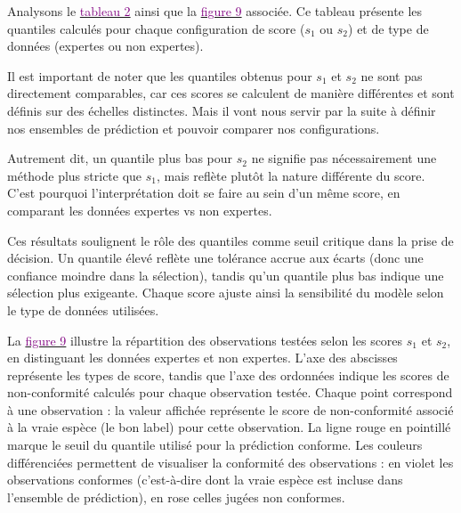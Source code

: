 \documentclass[a4paper,12pt]{article}
\begin{document}
Analysons le \hyperref[tab: scores et quantiles]{\textcolor{purple}{tableau 2}} ainsi que la \hyperref[fig:quantiles]{\textcolor{purple}{figure 9}} associée.
Ce tableau présente les quantiles calculés pour chaque configuration de score ($s_1$ ou $s_2$) et de type de données (expertes ou non expertes).

\vspace{0.2cm}

Il est important de noter que les quantiles obtenus pour $s_1$ et $s_2$ ne sont pas directement comparables, car ces scores se calculent de manière différentes et sont définis sur des échelles distinctes. Mais il vont nous servir par la suite à définir nos ensembles de prédiction et pouvoir comparer nos configurations.

\vspace{0.2cm}

Autrement dit, un quantile plus bas pour $s_2$ ne signifie pas nécessairement une méthode plus stricte que $s_1$, mais reflète plutôt la nature différente du score. C’est pourquoi l’interprétation doit se faire au sein d’un même score, en comparant les données expertes vs non expertes.

\vspace{0.2cm}

Ces résultats soulignent le rôle des quantiles comme seuil critique dans la prise de décision. Un quantile élevé reflète une tolérance accrue aux écarts (donc une confiance moindre dans la sélection), tandis qu’un quantile plus bas indique une sélection plus exigeante. Chaque score ajuste ainsi la sensibilité du modèle selon le type de données utilisées.

\vspace{0.2cm}

La \hyperref[fig:quantiles]{\textcolor{purple}{figure 9}} illustre la répartition des observations testées selon les scores $s_1$ et $s_2$, en distinguant les données expertes et non expertes. L’axe des abscisses représente les types de score, tandis que l’axe des ordonnées indique les scores de non-conformité calculés pour chaque observation testée. Chaque point correspond à une observation : la valeur affichée représente le score de non-conformité associé à la vraie espèce (le bon label) pour cette observation. La ligne rouge en pointillé marque le seuil du quantile utilisé pour la prédiction conforme. Les couleurs différenciées permettent de visualiser la conformité des observations : en violet les observations conformes (c’est-à-dire dont la vraie espèce est incluse dans l’ensemble de prédiction), en rose celles jugées non conformes.
\end{document}

